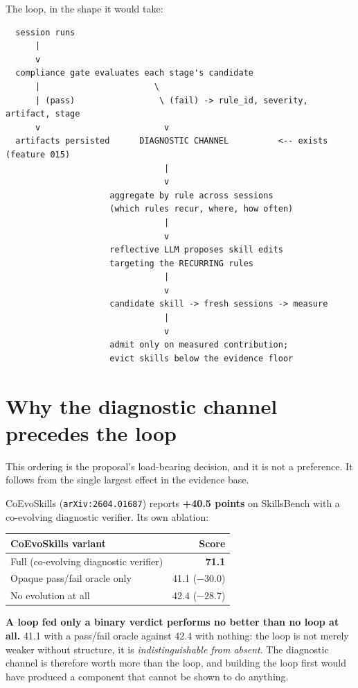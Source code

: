 \documentclass[11pt,a4paper]{article}
\begin{document}
The loop, in the shape it would take:

\begin{lstlisting}
  session runs
      |
      v
  compliance gate evaluates each stage's candidate
      |                       \
      | (pass)                 \ (fail) -> rule_id, severity, artifact, stage
      v                         v
  artifacts persisted      DIAGNOSTIC CHANNEL          <-- exists (feature 015)
                                |
                                v
                     aggregate by rule across sessions
                     (which rules recur, where, how often)
                                |
                                v
                     reflective LLM proposes skill edits
                     targeting the RECURRING rules
                                |
                                v
                     candidate skill -> fresh sessions -> measure
                                |
                                v
                     admit only on measured contribution;
                     evict skills below the evidence floor
\end{lstlisting}

\section{Why the diagnostic channel precedes the loop}
\label{sec:channel}

This ordering is the proposal's load-bearing decision, and it is not a preference.
It follows from the single largest effect in the evidence base.

CoEvoSkills (\texttt{arXiv:2604.01687}) reports \textbf{+40.5 points} on
SkillsBench with a co-evolving diagnostic verifier. Its own ablation:

\begin{center}
\begin{tabular}{@{}lr@{}}
\toprule
\textbf{CoEvoSkills variant} & \textbf{Score} \\
\midrule
Full (co-evolving diagnostic verifier) & \textbf{71.1} \\
Opaque pass/fail oracle only & 41.1 \quad ($-30.0$) \\
No evolution at all & 42.4 \quad ($-28.7$) \\
\bottomrule
\end{tabular}
\end{center}

\textbf{A loop fed only a binary verdict performs no better than no loop at all.}
41.1 with a pass/fail oracle against 42.4 with nothing: the loop is not merely
weaker without structure, it is \emph{indistinguishable from absent}. The
diagnostic channel is therefore worth more than the loop, and building the loop
first would have produced a component that cannot be shown to do anything.
\end{document}
